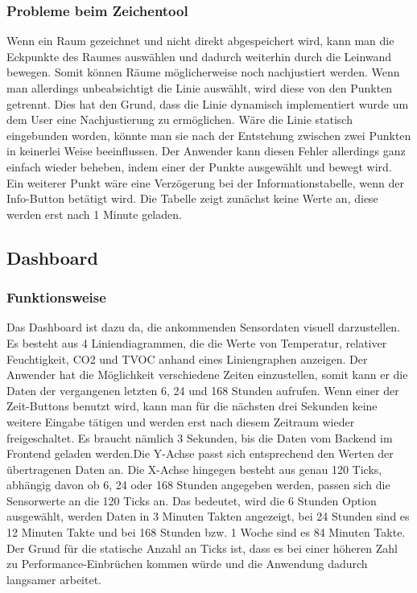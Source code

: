 \documentclass[]{article}
\begin{document}
				\subsubsection{Probleme beim Zeichentool}
		 		Wenn ein Raum gezeichnet und nicht direkt abgespeichert wird, kann man die Eckpunkte des Raumes auswählen und dadurch weiterhin durch die Leinwand bewegen. Somit können Räume möglicherweise noch nachjustiert werden. Wenn man allerdings unbeabsichtigt die Linie auswählt, wird diese von den Punkten getrennt. Dies hat den Grund, dass die Linie dynamisch implementiert wurde um dem User eine Nachjustierung zu ermöglichen. Wäre die Linie statisch eingebunden worden, könnte man sie nach der Entstehung zwischen zwei Punkten in keinerlei Weise beeinflussen. Der Anwender kann diesen Fehler allerdings ganz einfach wieder beheben, indem einer der Punkte ausgewählt und bewegt wird. \newline Ein weiterer Punkt wäre eine Verzögerung bei der Informationstabelle, wenn der Info-Button betätigt wird. Die Tabelle zeigt zunächst keine Werte an, diese werden erst nach 1 Minute geladen. 
				\newpage
			\subsection{Dashboard}
			\subsubsection{Funktionsweise}
			Das Dashboard ist dazu da, die ankommenden Sensordaten visuell darzustellen. Es besteht aus 4 Liniendiagrammen, die die Werte von Temperatur, relativer Feuchtigkeit, CO2 und TVOC anhand eines Liniengraphen anzeigen. Der Anwender hat die Möglichkeit verschiedene Zeiten einzustellen, somit kann er die Daten der vergangenen letzten 6, 24 und 168 Stunden aufrufen.
			Wenn einer der Zeit-Buttons benutzt wird, kann man für die nächsten drei Sekunden keine weitere Eingabe tätigen und werden erst nach diesem Zeitraum wieder freigeschaltet. Es braucht nämlich 3 Sekunden, bis die Daten vom Backend im Frontend geladen werden.\newline Die Y-Achse passt sich entsprechend den Werten der übertragenen Daten an. Die X-Achse hingegen besteht aus genau 120 Ticks, abhängig davon ob 6, 24 oder 168 Stunden angegeben werden, passen sich die Sensorwerte an die 120 Ticks an. Das bedeutet, wird die 6 Stunden Option ausgewählt, werden Daten in 3 Minuten Takten angezeigt, bei 24 Stunden sind es 12 Minuten Takte und bei 168 Stunden bzw. 1 Woche sind es 84 Minuten Takte. Der Grund für die statische Anzahl an Ticks ist, dass es bei einer höheren Zahl zu Performance-Einbrüchen kommen würde und die Anwendung dadurch langsamer arbeitet.\newline
			
\end{document}
